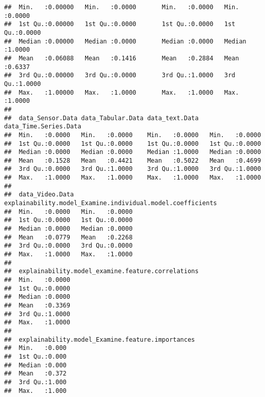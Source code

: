 \documentclass[
]{article}
\begin{document}
\begin{verbatim}
##  Min.   :0.00000   Min.   :0.0000       Min.   :0.0000   Min.   :0.0000     
##  1st Qu.:0.00000   1st Qu.:0.0000       1st Qu.:0.0000   1st Qu.:0.0000     
##  Median :0.00000   Median :0.0000       Median :0.0000   Median :1.0000     
##  Mean   :0.06088   Mean   :0.1416       Mean   :0.2884   Mean   :0.6337     
##  3rd Qu.:0.00000   3rd Qu.:0.0000       3rd Qu.:1.0000   3rd Qu.:1.0000     
##  Max.   :1.00000   Max.   :1.0000       Max.   :1.0000   Max.   :1.0000     
##                                                                             
##  data_Sensor.Data data_Tabular.Data data_text.Data   data_Time.Series.Data
##  Min.   :0.0000   Min.   :0.0000    Min.   :0.0000   Min.   :0.0000       
##  1st Qu.:0.0000   1st Qu.:0.0000    1st Qu.:0.0000   1st Qu.:0.0000       
##  Median :0.0000   Median :0.0000    Median :1.0000   Median :0.0000       
##  Mean   :0.1528   Mean   :0.4421    Mean   :0.5022   Mean   :0.4699       
##  3rd Qu.:0.0000   3rd Qu.:1.0000    3rd Qu.:1.0000   3rd Qu.:1.0000       
##  Max.   :1.0000   Max.   :1.0000    Max.   :1.0000   Max.   :1.0000       
##                                                                           
##  data_Video.Data  explainability.model_Examine.individual.model.coefficients
##  Min.   :0.0000   Min.   :0.0000                                            
##  1st Qu.:0.0000   1st Qu.:0.0000                                            
##  Median :0.0000   Median :0.0000                                            
##  Mean   :0.0779   Mean   :0.2268                                            
##  3rd Qu.:0.0000   3rd Qu.:0.0000                                            
##  Max.   :1.0000   Max.   :1.0000                                            
##                                                                             
##  explainability.model_examine.feature.correlations
##  Min.   :0.0000                                   
##  1st Qu.:0.0000                                   
##  Median :0.0000                                   
##  Mean   :0.3369                                   
##  3rd Qu.:1.0000                                   
##  Max.   :1.0000                                   
##                                                   
##  explainability.model_Examine.feature.importances
##  Min.   :0.000                                   
##  1st Qu.:0.000                                   
##  Median :0.000                                   
##  Mean   :0.372                                   
##  3rd Qu.:1.000                                   
##  Max.   :1.000                                   

\end{verbatim}
\end{document}
